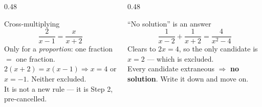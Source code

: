 \documentclass[aspectratio=169, 11pt]{beamer}
\begin{document}
\begin{frame}[t, plain]
  \begin{columns}[T]
    \begin{column}{0.48\textwidth}
      \begin{block}{Cross-multiplying}
        \[ \frac{2}{x-1}=\frac{x}{x+2} \]
        Only for a \emph{proportion}: one fraction $=$ one fraction. \\[3pt]
        $2(x+2)=x(x-1) \Rightarrow x=4$ or $x=-1$. Neither excluded. \\[3pt]
        It is not a new rule --- it is Step 2, pre-cancelled.
      \end{block}
    \end{column}
    \begin{column}{0.48\textwidth}
      \begin{block}{``No solution'' is an answer}
        \[ \frac{1}{x-2}+\frac{1}{x+2}=\frac{4}{x^2-4} \]
        Clears to $2x=4$, so the only candidate is $x=2$ --- which is excluded. \\[3pt]
        Every candidate extraneous $\Rightarrow$ \textbf{no solution}. Write it down and move on.
      \end{block}
    \end{column}
  \end{columns}
\end{frame}
\end{document}
